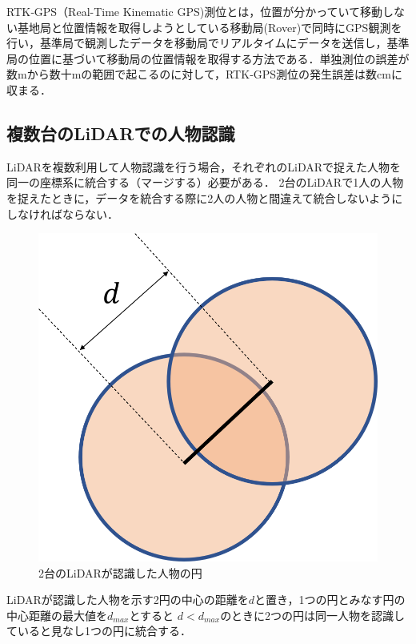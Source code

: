 \documentclass[autodetect-engine,dvipdfmx-if-dvi,ja=standard,a4j,jbase=10.5pt,twoside,twocolumn,magstyle=nomag*]{bxjsarticle}
\begin{document}
RTK‐GPS（Real-Time Kinematic GPS)測位とは，位置が分かっていて移動しない基地局と位置情報を取得しようとしている移動局(Rover)で同時にGPS観測を行い，基準局で観測したデータを移動局でリアルタイムにデータを送信し，基準局の位置に基づいて移動局の位置情報を取得する方法である．単独測位の誤差が数mから数十mの範囲で起こるのに対して，RTK‐GPS測位の発生誤差は数cmに収まる．

\subsection{複数台のLiDARでの人物認識} 
LiDARを複数利用して人物認識を行う場合，それぞれのLiDARで捉えた人物を同一の座標系に統合する（マージする）必要がある．
2台のLiDARで1人の人物を捉えたときに，データを統合する際に2人の人物と間違えて統合しないようにしなければならない．

\begin{figure}[h]
    \centering
    \includegraphics[width=0.7\linewidth, clip]{./figure/merge_circle.png}
    \caption{2台のLiDARが認識した人物の円}
    \label{fig:circle}
\end{figure}

LiDARが認識した人物を示す2円の中心の距離を$d$と置き，1つの円とみなす円の中心距離の最大値を$d_{max}$とすると
$d < d_{max}$のときに2つの円は同一人物を認識していると見なし1つの円に統合する．
\end{document}
